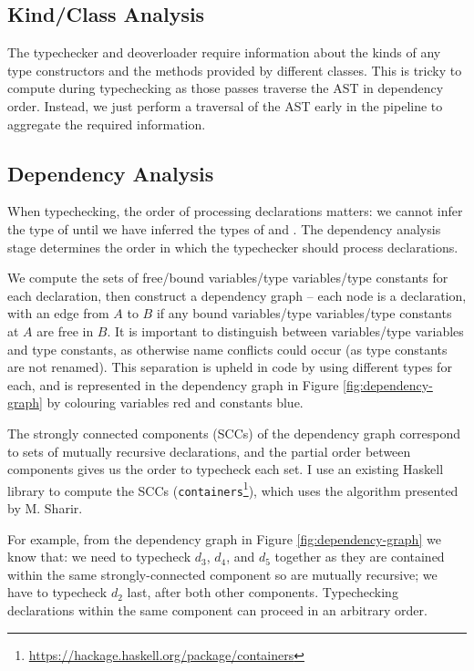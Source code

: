 \documentclass[dissertation.tex]{subfiles}
\begin{document}
{    \subsection{Kind/Class Analysis}
    {
        The typechecker and deoverloader require information about the kinds of any type constructors and the methods provided by different classes. This is tricky to compute during typechecking as those passes traverse the AST in dependency order. Instead, we just perform a traversal of the AST early in the pipeline to aggregate the required information. 
    }
    \subsection{Dependency Analysis}\label{sec:dependency-analysis}
    {
        When typechecking, the order of processing declarations matters: we cannot infer the type of  until we have inferred the types of  and . The dependency analysis stage determines the order in which the typechecker should process declarations. 

        We compute the sets of free/bound variables/type variables/type constants for each declaration, then construct a dependency graph -- each node is a declaration, with an edge from \(A\) to \(B\) if any bound variables/type variables/type constants at \(A\) are free in \(B\). It is important to distinguish between variables/type variables and type constants, as otherwise name conflicts could occur (as type constants are not renamed). This separation is upheld in code by using different types for each, and is represented in the dependency graph in Figure \ref{fig:dependency-graph} by colouring variables red and constants blue.

        The strongly connected components (SCCs) of the dependency graph correspond to sets of mutually recursive declarations, and the partial order between components gives us the order to typecheck each set. I use an existing Haskell library to compute the SCCs (\texttt{containers}\footnote{\url{https://hackage.haskell.org/package/containers}}), which uses the algorithm presented by M. Sharir\cite{SCC}.

        For example, from the dependency graph in Figure \ref{fig:dependency-graph} we know that: we need to typecheck \(d_3\), \(d_4\), and \(d_5\) together as they are contained within the same strongly-connected component so are mutually recursive; we have to typecheck \(d_2\) last, after both other components. Typechecking declarations within the same component can proceed in an arbitrary order.

}}
\end{document}
